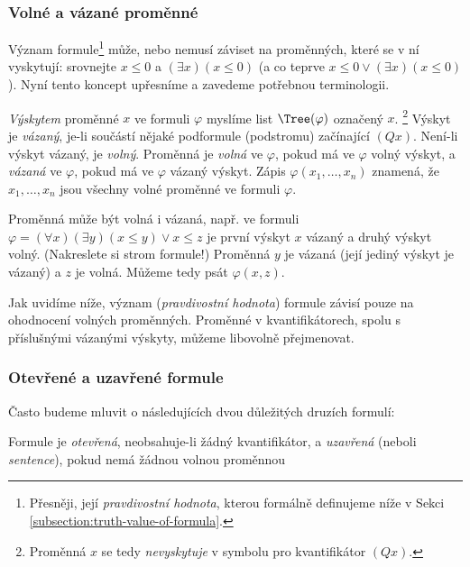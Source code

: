 \subsubsection{Volné a vázané proměnné}

Význam formule\footnote{Přesněji, její \emph{pravdivostní hodnota}, kterou formálně definujeme níže v Sekci \ref{subsection:truth-value-of-formula}.} může, nebo nemusí záviset na proměnných, které se v ní vyskytují: srovnejte $x\leq 0$ a $(\exists x)(x\leq 0)$ (a co teprve $x\leq 0 \lor (\exists x)(x\leq 0)$). Nyní tento koncept upřesníme a zavedeme potřebnou terminologii.


\emph{Výskytem} proměnné $x$ ve formuli $\varphi$ myslíme list $\Tree(\varphi)$ označený $x$. \footnote{Proměnná $x$ se tedy \emph{nevyskytuje} v symbolu pro kvantifikátor $(Qx)$.} Výskyt je \emph{vázaný}, je-li součástí nějaké podformule (podstromu) začínající $(Qx)$. Není-li výskyt vázaný, je \emph{volný}. Proměnná je \emph{volná} ve $\varphi$, pokud má ve $\varphi$ volný výskyt, a \emph{vázaná} ve $\varphi$, pokud má ve $\varphi$ vázaný výskyt. Zápis $\varphi(x_1,\dots,x_n)$ znamená, že $x_1,\dots,x_n$ jsou všechny volné proměnné ve formuli $\varphi$.

\begin{example}
    Proměnná může být volná i vázaná, např. ve formuli $\varphi=(\forall x)(\exists y)(x\leq y)\lor x\leq z$ je první výskyt $x$ vázaný a druhý výskyt volný. (Nakreslete si strom formule!) Proměnná $y$ je vázaná (její jediný výskyt je vázaný) a $z$ je volná. Můžeme tedy psát $\varphi(x,z)$.
\end{example}

\begin{remark}
    Jak uvidíme níže, význam (\emph{pravdivostní hodnota}) formule závisí pouze na ohodnocení volných proměnných. Proměnné v kvantifikátorech, spolu s příslušnými vázanými výskyty, můžeme libovolně přejmenovat.   
\end{remark}

\subsubsection{Otevřené a uzavřené formule}

Často budeme mluvit o následujících dvou důležitých druzích formulí:

\begin{definition}
Formule je \emph{otevřená}, neobsahuje-li žádný kvantifikátor, a \emph{uzavřená} (neboli \emph{sentence}), pokud nemá žádnou volnou proměnnou  
\end{definition}

